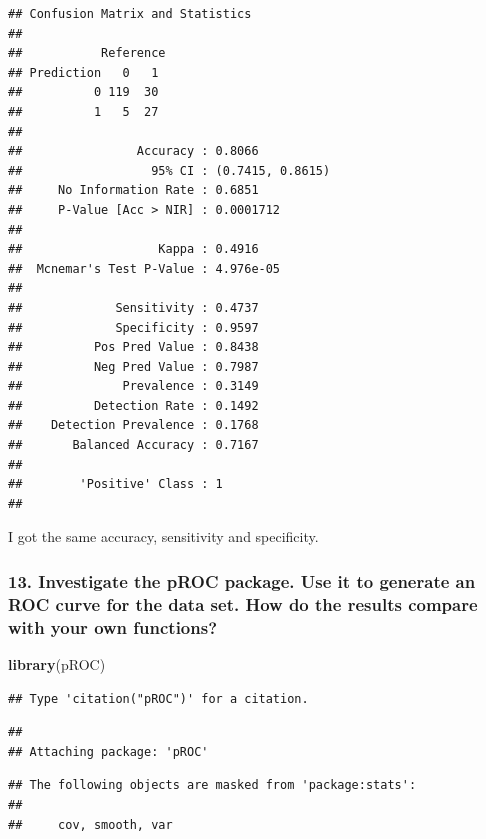 \documentclass[]{article}
\newenvironment{Shaded}{\begin{snugshade}}{\end{snugshade}}
\newcommand{\KeywordTok}[1]{\textcolor[rgb]{0.13,0.29,0.53}{\textbf{{#1}}}}
\newcommand{\NormalTok}[1]{{#1}}
\begin{document}
\begin{verbatim}
## Confusion Matrix and Statistics
## 
##           Reference
## Prediction   0   1
##          0 119  30
##          1   5  27
##                                           
##                Accuracy : 0.8066          
##                  95% CI : (0.7415, 0.8615)
##     No Information Rate : 0.6851          
##     P-Value [Acc > NIR] : 0.0001712       
##                                           
##                   Kappa : 0.4916          
##  Mcnemar's Test P-Value : 4.976e-05       
##                                           
##             Sensitivity : 0.4737          
##             Specificity : 0.9597          
##          Pos Pred Value : 0.8438          
##          Neg Pred Value : 0.7987          
##              Prevalence : 0.3149          
##          Detection Rate : 0.1492          
##    Detection Prevalence : 0.1768          
##       Balanced Accuracy : 0.7167          
##                                           
##        'Positive' Class : 1               
## 
\end{verbatim}

I got the same accuracy, sensitivity and specificity.

\subsubsection{13. Investigate the pROC package. Use it to generate an
ROC curve for the data set. How do the results compare with your own
functions?}\label{investigate-the-proc-package.-use-it-to-generate-an-roc-curve-for-the-data-set.-how-do-the-results-compare-with-your-own-functions}

\begin{Shaded}
\begin{Highlighting}[]
\KeywordTok{library}\NormalTok{(pROC)}
\end{Highlighting}
\end{Shaded}

\begin{verbatim}
## Type 'citation("pROC")' for a citation.
\end{verbatim}

\begin{verbatim}
## 
## Attaching package: 'pROC'
\end{verbatim}

\begin{verbatim}
## The following objects are masked from 'package:stats':
## 
##     cov, smooth, var
\end{verbatim}
\end{document}
